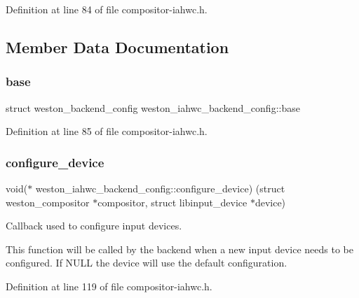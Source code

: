 Definition at line 84 of file compositor-\/iahwc.\+h.



\subsection{Member Data Documentation}
\mbox{\label{structweston__iahwc__backend__config_a8b826a5287e002811707353940abebd0}} 
\subsubsection{\texorpdfstring{base}{base}}
{\footnotesize\ttfamily struct weston\+\_\+backend\+\_\+config weston\+\_\+iahwc\+\_\+backend\+\_\+config\+::base}



Definition at line 85 of file compositor-\/iahwc.\+h.

\mbox{\label{structweston__iahwc__backend__config_af60c36d07f2eae72f1164e2497a072f2}} 
\subsubsection{\texorpdfstring{configure\+\_\+device}{configure\_device}}
{\footnotesize\ttfamily void($\ast$ weston\+\_\+iahwc\+\_\+backend\+\_\+config\+::configure\+\_\+device) (struct weston\+\_\+compositor $\ast$compositor, struct libinput\+\_\+device $\ast$device)}

Callback used to configure input devices.

This function will be called by the backend when a new input device needs to be configured. If N\+U\+LL the device will use the default configuration. 

Definition at line 119 of file compositor-\/iahwc.\+h.

\mbox{\label{structweston__iahwc__backend__config_a7724433a34f97ba19aed8cf44e439257}} 
